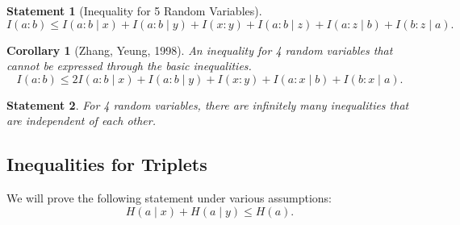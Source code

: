 \documentclass[12pt,sans]{article}
\theoremstyle{definition}
\theoremstyle{plain}
\newtheorem{statement}{Statement}[section]
\newtheorem{corollary}{Corollary}[section]
\theoremstyle{remark}
\begin{document}
\begin{statement}[Inequality for 5 Random Variables]
    \[
        I(a : b) \le I(a : b \mid x) + I(a : b \mid y) + I(x : y)
        + I(a : b \mid z) + I(a : z \mid b) + I(b : z \mid a).
    \]
\end{statement}
\begin{corollary}[Zhang, Yeung, 1998]
    An inequality for 4 random variables that cannot be expressed through the basic inequalities.
    \[
        I(a : b) \le 2I(a : b \mid x) + I(a : b \mid y) + I(x : y)
        + I(a : x \mid b) + I(b : x \mid a).
    \]
\end{corollary}
\begin{statement}
    For 4 random variables, there are infinitely many inequalities that are independent of each other.
\end{statement}

\subsection{Inequalities for Triplets}
We will prove the following statement under various assumptions:
\[
    H(a \mid x) + H(a \mid y) \le H(a).
\]
\end{document}

